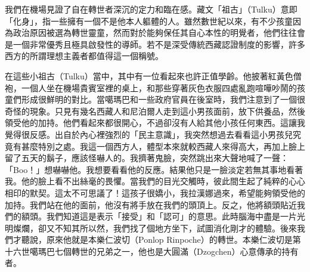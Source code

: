 我們在機場見證了自在轉世者深沉的定力和臨在感。藏文「祖古」（Tulku）意即「化身」，指一些擁有一個不是他本人軀體的人。雖然數世紀以來，有不少孩童因為政治原因被選為轉世靈童，然而對於能夠保任其自心本性的明覺者，他們往往會是一個非常優秀且極具啟發性的導師。若不是深受傳統西藏認證制度的影響，許多西方的所謂理想主義者都值得這一個稱號。

在這些小祖古（Tulku）當中，其中有一位看起來也許正值學齡。他披著紅黃色僧袍，一個人坐在機場貴賓室裡的桌上，和那些穿著灰色衣服四處亂跑喧嘩吵鬧的孩童們形成很鮮明的對比。當噶瑪巴和一些政府官員在後室時，我們注意到了一個很奇怪的現象。只見有幾名西藏人和尼泊爾人走到這小男孩面前，放下供養品，然後領受他的加持。他們看起來都很開心，不過卻沒有人給其他小孩任何東西。這讓我覺得很反感。出自於內心裡強烈的「民主意識」，我突然想過去看看這小男孩兒究竟有甚麼特別之處。我這一個西方人，體型本來就較西藏人來得高大，再加上臉上留了五天的鬍子，應該怪嚇人的。我擠著鬼臉，突然跳出來大聲地喊了一聲：「Boo！」想嚇嚇他。我想要看看他的反應。結果他只是一臉淡定若無其事地看著我。他的臉上看不出絲毫的畏懼。當我們的目光交觸時，彼此間生起了純粹的心心相印的默契。這太不可思議了！這孩子很嬌小，我拉漢娜過來，希望能夠領受他的加持。我們站在他的面前，他沒有將手放在我們的頭頂上。反之，他將額頭貼近我們的額頭。我們知道這是表示「接受」和「認可」的意思。此時腦海中盡是一片光明燦爛，卻又不知其所以然，我們找了個地方坐下，試圖消化剛才的體驗。後來我們才聽說，原來他就是本樂仁波切（Ponlop
Rinpoche）的轉世。本樂仁波切是第十六世噶瑪巴七個轉世的兄弟之一，他也是大圓滿（Dzogchen）心意傳承的持有者。

